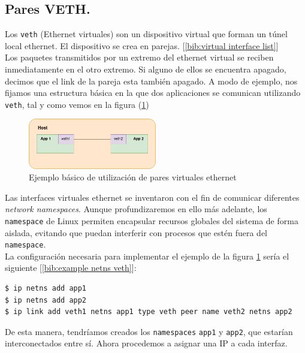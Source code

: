 \documentclass[12pt]{article}
\begin{document}
	\pagebreak
	
	\subsection{Pares VETH.}
	\label{sec: veth}
	\noindent Los \texttt{veth} (Ethernet virtuales) son un dispositivo virtual que forman un túnel local ethernet. El dispositivo se crea en parejas. [\ref{bib:virtual interface list}]\\
	
	\noindent Los paquetes transmitidos por un extremo del ethernet virtual se reciben inmediatamente en el otro extremo. Si alguno de ellos se encuentra apagado, decimos que el link de la pareja esta también apagado. A modo de ejemplo, nos fijamos una estructura básica en la que dos aplicaciones se comunican utilizando \texttt{veth}, tal y como vemos en la figura (\ref{ej1 veth})\\
	
	\begin{figure}[h]
		\begin{center}
			\includegraphics[width=0.5\textwidth]{img/veth_ej1.png}
			\caption{Ejemplo básico de utilización de pares virtuales ethernet}
			\label{ej1 veth}
		\end{center}
	\end{figure}

	\noindent Las interfaces virtuales ethernet se inventaron con el fin de comunicar diferentes \textit{network namespaces}. Aunque profundizaremos en ello más adelante, los \texttt{namespace} de Linux permiten encapsular recursos globales del sistema de forma aislada, evitando que puedan interferir con procesos que estén fuera del \texttt{namespace}.\\
	
	\noindent La configuración necesaria para implementar el ejemplo de la figura \ref{ej1 veth} sería el siguiente [\ref{bib:example netns veth}]:
	
	\begin{verbatim}
$ ip netns add app1
$ ip netns add app2
$ ip link add veth1 netns app1 type veth peer name veth2 netns app2
	\end{verbatim}
	
	\noindent De esta manera, tendríamos creados los \texttt{namespaces} \texttt{app1} y \texttt{app2}, que estarían interconectados entre sí. Ahora procedemos a asignar una IP a cada interfaz. 
	
\end{document}
